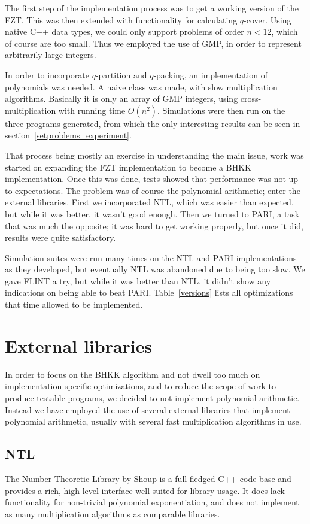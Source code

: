 \documentclass{cslthse-msc}
\begin{document}
The first step of the implementation process was to get a working version of the FZT. This was then extended with functionality for calculating $q$-cover. Using native C++ data types, we could only support problems of order $n < 12$, which of course are too small. Thus we employed the use of GMP, in order to represent arbitrarily large integers.

In order to incorporate $q$-partition and $q$-packing, an implementation of polynomials was needed. A naive class was made, with slow multiplication algorithms. Basically it is only an array of GMP integers, using cross-multiplication with running time $O(n^2)$. Simulations were then run on the three programs generated, from which the only interesting results can be seen in section~\ref{setproblems_experiment}.

That process being mostly an exercise in understanding the main issue, work was started on expanding the FZT implementation to become a BHKK implementation. Once this was done, tests showed that performance was not up to expectations. The problem was of course the polynomial arithmetic; enter the external libraries. First we incorporated NTL, which was easier than expected, but while it was better, it wasn't good enough. Then we turned to PARI, a task that was much the opposite; it was hard to get working properly, but once it did, results were quite satisfactory.

Simulation suites were run many times on the NTL and PARI implementations as they developed, but eventually NTL was abandoned due to being too slow. We gave FLINT a try, but while it was better than NTL, it didn't show any indications on being able to beat PARI. Table~\ref{versions} lists all optimizations that time allowed to be implemented.

\section{External libraries}\label{external}
In order to focus on the BHKK algorithm and not dwell too much on implementation-specific optimizations, and to reduce the scope of work to produce testable programs, we decided to not implement polynomial arithmetic. Instead we have employed the use of several external libraries that implement polynomial arithmetic, usually with several fast multiplication algorithms in use.

\subsection{NTL}
The Number Theoretic Library by Shoup \cite{ntl} is a full-fledged C++ code base and provides a rich, high-level interface well suited for library usage. It does lack functionality for non-trivial polynomial exponentiation, and does not implement as many multiplication algorithms as comparable libraries.
\end{document}
